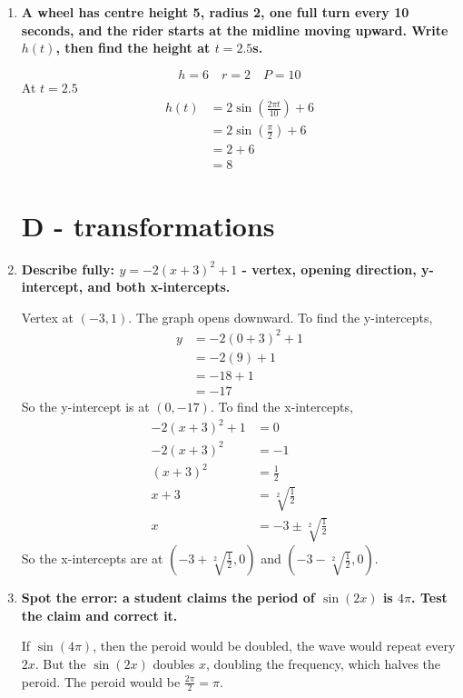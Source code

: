 \documentclass{article}
\begin{document}
\begin{enumerate}[itemsep=12pt]
    At low values of sine, most of the change in arc length of the circle is in height, so $\sin(0.03) \approx 0.03$.

  \item \textbf{A wheel has centre height 5, radius 2, one full turn every 10 seconds, and the rider starts at
    the midline moving upward. Write $h(t)$, then find the height at $t = 2.5$s.}

    \[
      h = 6 \quad r = 2 \quad P = 10
    \]
    At $t = 2.5$
    \begin{align*}
      h(t) &= 2\sin \left(\frac{2\pi t}{10} \right) + 6 \\
           &= 2\sin \left(\frac{\pi}{2} \right) + 6 \\
           &= 2 + 6 \\
           &= 8
    \end{align*}
   
  \section{D - transformations}
  \item \textbf{Describe fully: $y = -2(x + 3)^{2} + 1$ - vertex, opening direction, y-intercept, and both x-intercepts.}

    Vertex at $(-3, 1)$. The graph opens downward. To find the y-intercepts,
    \begin{align*}
      y &= -2(0 + 3)^{2} + 1 \\
        &= -2(9) + 1 \\
        &= -18 + 1 \\
        &= -17
    \end{align*}
    So the y-intercept is at $(0,-17)$. To find the x-intercepts,
    \begin{align*}
      -2(x + 3)^{2} + 1 &= 0 \\
      -2(x + 3)^{2} &= -1 \\
      (x + 3)^{2} &= \frac{1}{2} \\
      x + 3 &= \sqrt[2]{\frac{1}{2}} \\
      x &= -3 \pm \sqrt[2]{\frac{1}{2}}
    \end{align*}
    So the x-intercepts are at $(-3 + \sqrt[2]{\frac{1}{2}}, 0)$ and $(-3 - \sqrt[2]{\frac{1}{2}}, 0)$.

  \item \textbf{Spot the error: a student claims the period of $\sin(2x)$ is $4\pi$. Test the claim and correct it.} 

    If $\sin(4\pi)$, then the peroid would be doubled, the wave would repeat every $2x$. But the $\sin(2x)$ doubles $x$,
    doubling the frequency, which halves the peroid. The peroid would be $\frac{2\pi}{2} = \pi$.


\end{enumerate}
\end{document}
